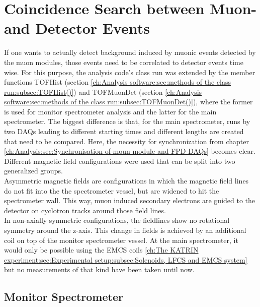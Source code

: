   \section{Coincidence Search between Muon- and Detector Events}
  \label{ch:Analysis:sec:Monitor Spectrometer Measurements}
  If one wants to actually detect background induced by muonic events detected by the muon modules, those events need to be correlated to detector events time wise. For this purpose, the analysis code's class run was extended by the member functions TOFHist (section \ref{ch:Analysis software:sec:methods of the class run:subsec:TOFHist()}) and TOFMuonDet (section \ref{ch:Analysis software:sec:methods of the class run:subsec:TOFMuonDet()}), where the former is used for monitor spectrometer analysis and the latter for the main spectrometer. The biggest difference is that, for the main spectrometer, runs by two DAQs leading to different starting times and different lengths are created that need to be compared. Here, the necessity for synchronization from chapter \ref{ch:Analysis:sec:Synchronisation of moun module and FPD DAQs} becomes clear. Different magnetic field configurations were used that can be split into two generalized groups.\\
  Asymmetric magnetic fields are configurations in which the magnetic field lines do not fit into the the spectrometer vessel, but are widened to hit the spectrometer wall. This way, muon induced secondary electrons are guided to the detector on cyclotron tracks around those field lines.\\
  In non-axially symmetric configurations, the fieldlines show no rotational symmetry around the z-axis. This change in fields is achieved by an additional coil on top of the monitor spectrometer vessel. At the main spectrometer, it would only be possible using the EMCS coils \ref{ch:The KATRIN experiment:sec:Experimental setup:subsec:Solenoids, LFCS and EMCS system} but no measurements of that kind have been taken until now.
  
  \subsection{Monitor Spectrometer}
  \label{ch:Analysis:sec:Monitor Spectrometer Measurements:subsec:Monitor Spectrometer}
  
